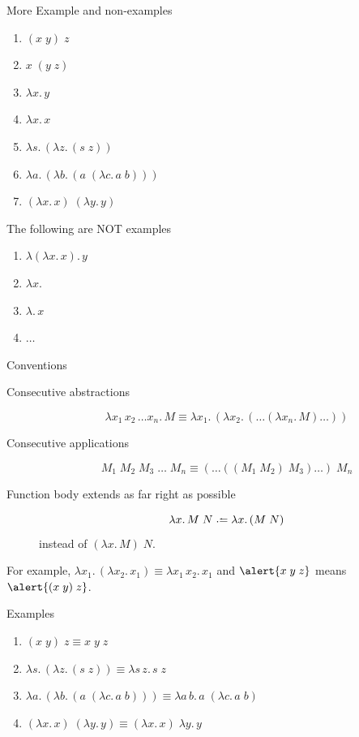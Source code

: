 \begin{frame}{More Example and non-examples}
  \begin{enumerate}
    \item $(x\;y)\;z$
    \item $x\;(y\; z)$
    \item $\lambda x.\, y$
    \item $\lambda x.\, x$
    \item $\lambda s.\,(\lambda z.\, (s \;z))$
    \item $\lambda a.\,(\lambda b.\, (a\;(\lambda c.\, a\; b)))$
    \item $(\lambda x.\, x)\;(\lambda y.\, y)$
  \end{enumerate}
  The following are NOT examples
  \begin{enumerate}
    \item $\lambda (\lambda x.\, x).\, y$
    \item $\lambda x. $
    \item $\lambda.\, x$
    \item $\dots$
  \end{enumerate}
\end{frame}

\begin{frame}{Conventions}
  \begin{description}
    \item[Consecutive abstractions]
      \[
        \lambda x_1\,x_2\,\ldots x_n.\, M \equiv \lambda x_1.\,(\lambda x_2.\,(\ldots (\lambda x_n.\, M)\ldots))
      \]
    \item[Consecutive applications]
      \[
        M_1\;M_2\; M_3\; \dots\;M_n \equiv (\dots((M_1\;M_2)\;M_3) \dots )\; M_n
      \]
    \item[Function body extends as far right as possible]
      \[
        \lambda x.\, M\;N \defeq \lambda x.\,(M\; N)
      \]
      instead of $(\lambda x.\,M)\; N$.
  \end{description}
  For example, 
      $\lambda x_1.\,(\lambda x_2.\, x_1) \equiv \lambda x_1\,x_2.\,x_1$
      and
      $\alert{x\;y\;z}$ means $\alert{(x\; y)\;z}$. 

\end{frame}

\begin{frame}{Examples}
  \begin{enumerate}
    \item $(x\;y)\;z \equiv x\;y\;z$
    \item $\lambda s.\,(\lambda z.\, (s \;z)) \equiv \lambda s\,z.\, s\;z$
    \item $\lambda a.\,(\lambda b.\, (a\;(\lambda c.\, a\; b))) \equiv \lambda a\,b.\, a\;(\lambda c.\, a\;b)$
    \item $(\lambda x.\, x)\;(\lambda y.\, y) \equiv (\lambda x.\, x)\;\lambda y.\, y$
  \end{enumerate}
\end{frame}

